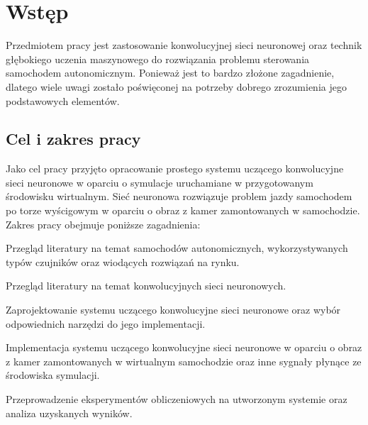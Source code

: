 \chapter*{Wstęp}
Przedmiotem pracy jest zastosowanie konwolucyjnej sieci neuronowej oraz technik głębokiego uczenia maszynowego do rozwiązania problemu sterowania samochodem autonomicznym. Ponieważ jest to bardzo złożone zagadnienie, dlatego wiele uwagi zostało poświęconej na potrzeby dobrego zrozumienia jego podstawowych elementów.

\vspace*{1.5cm}
\section*{Cel i zakres pracy}
Jako cel pracy przyjęto opracowanie prostego systemu uczącego konwolucyjne sieci neuronowe w oparciu o symulacje uruchamiane w przygotowanym środowisku wirtualnym. Sieć neuronowa rozwiązuje problem jazdy samochodem po torze wyścigowym w oparciu o obraz z kamer zamontowanych w samochodzie. \\
Zakres pracy obejmuje poniższe zagadnienia:
\begin{enumerate*}
\item Przegląd literatury na temat samochodów autonomicznych, wykorzystywanych typów czujników oraz wiodących rozwiązań na rynku.
\item Przegląd literatury na temat konwolucyjnych sieci neuronowych.
\item Zaprojektowanie systemu uczącego konwolucyjne sieci neuronowe oraz wybór odpowiednich narzędzi do jego implementacji.
\item Implementacja systemu uczącego konwolucyjne sieci neuronowe w oparciu o obraz z kamer zamontowanych w wirtualnym samochodzie oraz inne sygnały płynące ze środowiska symulacji.
\item Przeprowadzenie eksperymentów obliczeniowych na utworzonym systemie oraz analiza uzyskanych wyników.
\end{enumerate*}

\newpage

